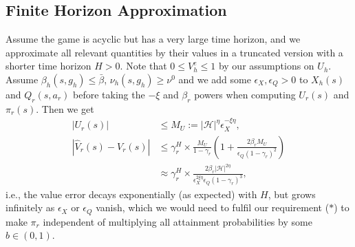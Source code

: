 \documentclass[letterpaper]{article} %
\def\G{\mathcal{G}}
\def\H{\mathcal{H}}
\begin{document}
\subsection*{Finite Horizon Approximation}

Assume the game is acyclic but has a very large time horizon, and we approximate all relevant quantities by their values in a truncated version with a shorter time horizon $H>0$. 
Note that $0\le V^e_h\le 1$ by our assumptions on $U_h$.
Assume $\beta_h(s,g_h)\le\bar\beta$, $\nu_h(s,g_h)\ge\nu^0$ and we add some $\epsilon_X,\epsilon_Q>0$ to $X_h(s)$ and $Q_r(s,a_r)$ before taking the $-\xi$ and $\beta_r$ powers when computing $U_r(s)$ and $\pi_r(s)$.
Then we get
\begin{align*}
    |U_r(s)| &\le M_U := |\H|^\eta \epsilon_X^{-\xi\eta}, \\
    |\hat V_r(s) - V_r(s)| %
    &\le \gamma_r^H\times\frac{M_U}{1 - \gamma_r}
    \left(
        1 + \frac{2\beta_r M_U}{\epsilon_Q (1 - \gamma_r)^2}
    \right) \\
    &\approx \gamma_r^H\times
    \frac{2\beta_r |\H|^{2\eta}}{\epsilon_X^{2\xi\eta}\epsilon_Q (1 - \gamma_r)^3},
\end{align*}
i.e., the value error decays exponentially (as expected) with $H$, but grows infinitely as $\epsilon_X$ or $\epsilon_Q$ vanish,
which we would need to fulfil our requirement ($\ast$) to make $\pi_r$ independent of multiplying all attainment probabilities by some $b\in(0,1)$.
\end{document}
